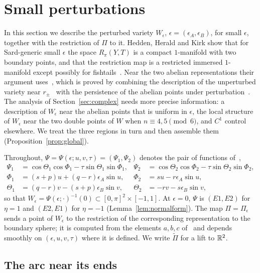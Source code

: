 \section{Small perturbations}\label{sec:perturb}

In this section we describe the perturbed variety $W_\epsilon$, $\epsilon=(\epsilon_A,\epsilon_B)$, for small $\epsilon$,
together with the restriction of $\Pi$ to it. Hedden, Herald and Kirk show that for Sard-generic small
$\epsilon$ the space $R_\pi(Y,T)$ is a compact $1$-manifold with two boundary points, and that the restriction
map is a restricted immersed $1$-manifold except possibly for fishtails~\cite[Thm.~10.1]{HHK2}. Near the two
abelian representations their argument uses~\cite[Thm.~8.4]{HHK2}, which is proved by combining the
description of the unperturbed variety near $r_\pm$~\cite[Prop.~8.1]{HHK2} with the persistence of the abelian
points under perturbation~\cite[Prop.~8.3]{HHK2}. The analysis of Section~\ref{sec:complex} needs more
precise information: a description of $W_\epsilon$ near the abelian points that is uniform in $\epsilon$, the
local structure of $W_\epsilon$ near the two double points of $W$ when $n\equiv4,5\pmod 6$, and $C^1$ control
elsewhere. We treat the three regions in turn and then assemble them (Proposition~\ref{prop:global}).

Throughout, $\Psi=\Psi(\epsilon;u,v,\tau)=(\Psi_1,\Psi_2)$ denotes the pair of functions of~\cite[(33)--(34)]{HHK2},
\begin{align*}
\Psi_1&=\cos\Theta_1\cos\Phi_1-\tau\sin\Theta_1\sin\Phi_1,& \Psi_2&=\cos\Theta_2\cos\Phi_2-\tau\sin\Theta_2\sin\Phi_2,\\
\Phi_1&=(s+p)u+(q-r)\epsilon_A\sin u,& \Phi_2&=su-r\epsilon_A\sin u,\\
\Theta_1&=(q-r)v-(s+p)\epsilon_B\sin v,& \Theta_2&=-rv-s\epsilon_B\sin v,
\end{align*}
so that $W_\epsilon=\Psi(\epsilon;\cdot)^{-1}(0)\subset[0,\pi]^2\times[-1,1]$. At $\epsilon=0$, $\Psi$ is $(E1,E2)$ for $\eta=1$ and
$(E2,E1)$ for $\eta=-1$ (Lemma~\ref{lem:normalform}). The map $\Pi=\Pi_\epsilon$ sends a point of $W_\epsilon$ to the
restriction of the corresponding representation to the boundary sphere; it is computed from the
elements $a,b,c$ of~\cite[(31)]{HHK2} and depends smoothly on $(\epsilon,u,v,\tau)$ where it is defined. We write
$\widetilde\Pi$ for a lift to $\mathbb{R}^2$.

\subsection{The arc near its ends}\label{subsec:corners}

